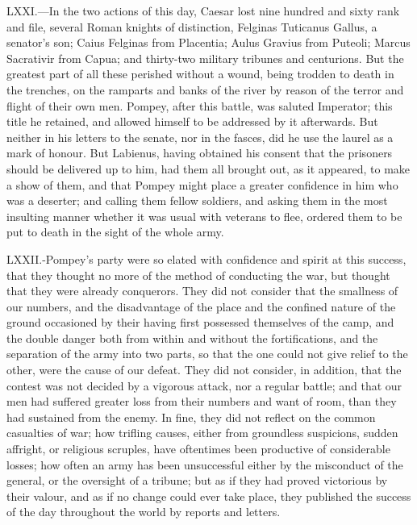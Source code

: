 LXXI.—In the two actions of this day, Caesar lost nine hundred and
sixty rank and file, several Roman knights of distinction, Felginas
Tuticanus Gallus, a senator's son; Caius Felginas from Placentia; Aulus
Gravius from Puteoli; Marcus Sacrativir from Capua; and thirty-two
military tribunes and centurions. But the greatest part of all these
perished without a wound, being trodden to death in the trenches, on the
ramparts and banks of the river by reason of the terror and flight of
their own men. Pompey, after this battle, was saluted Imperator; this
title he retained, and allowed himself to be addressed by it afterwards.
But neither in his letters to the senate, nor in the fasces, did he use
the laurel as a mark of honour. But Labienus, having obtained his
consent that the prisoners should be delivered up to him, had them all
brought out, as it appeared, to make a show of them, and that Pompey
might place a greater confidence in him who was a deserter; and calling
them fellow soldiers, and asking them in the most insulting manner
whether it was usual with veterans to flee, ordered them to be put to
death in the sight of the whole army.

LXXII.-Pompey's party were so elated with confidence and spirit at this
success, that they thought no more of the method of conducting the war,
but thought that they were already conquerors. They did not consider
that the smallness of our numbers, and the disadvantage of the place and
the confined nature of the ground occasioned by their having first
possessed themselves of the camp, and the double danger both from within
and without the fortifications, and the separation of the army into two
parts, so that the one could not give relief to the other, were the
cause of our defeat. They did not consider, in addition, that the
contest was not decided by a vigorous attack, nor a regular battle; and
that our men had suffered greater loss from their numbers and want of
room, than they had sustained from the enemy. In fine, they did not
reflect on the common casualties of war; how trifling causes, either
from groundless suspicions, sudden affright, or religious scruples, have
oftentimes been productive of considerable losses; how often an army has
been unsuccessful either by the misconduct of the general, or the
oversight of a tribune; but as if they had proved victorious by their
valour, and as if no change could ever take place, they published the
success of the day throughout the world by reports and letters.

